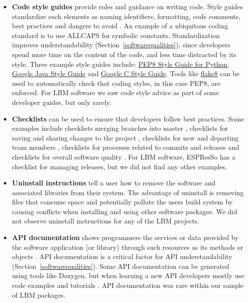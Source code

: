 \documentclass[final, 3p, times, authoryear]{elsarticle}
\newcommand{\CC}{C\nolinebreak\hspace{-.05em}\raisebox{.4ex}{\small\bf
+}\nolinebreak\hspace{-.10em}\raisebox{.4ex}{\small\bf +}}
\begin{document}
\begin{itemize}
\item \textbf{Code style guides} provide rules and guidance on writing code.
Style guides standardize such elements as naming identifiers, formatting, code
comments, best practices and dangers to avoid \citep{Carty2020}. An example of a
ubiquitous coding standard is to use ALLCAPS for symbolic constants.
Standardization improves understandability (Section~\ref{softwarequalities}),
since developers spend more time on the content of the code, and less time
distracted by its style.  Three example style guides include:
\href{http://cnl.sogang.ac.kr/cnlab/lectures/programming/python/PEP8_Style_Guide.pdf}
{PEP8 Style Guide for Python},
\href{https://google.github.io/styleguide/javaguide.html} {Google Java Style
Guide} and \href{https://google.github.io/styleguide/cppguide.html} {Google \CC
Style Guide}.  Tools like \href{https://pypi.org/project/flake8/}{flake8} can be
used to automatically check that coding styles, in this case PEP8, are enforced.
For LBM software we saw code style advice as part of some developer guides, but
only rarely.

\item \textbf{Checklists} can be used to ensure that developers follow best
practices.  Some examples include checklists merging branches into master
\citep{Brown2015}, checklists for saving and sharing changes to the project
\citep{WilsonEtAl2016}, checklists for new and departing team members
\citep{HerouxAndBernholdt2018}, checklists for processes related to commits and
releases \citep{HerouxEtAl2008} and checklists for overall software quality
\citep{ThielEtAl2020, SSI2022}.  For LBM software, ESPResSo has a checklist for
managing releases, but we did not find any other examples.

\item \textbf{Uninstall instructions} tell a user how to remove the software and
associated libraries from their system.  The advantage of uninstall is removing
files that consume space and potentially pollute the users build system by
causing conflicts when installing and using other software packages.  We did not
observe uninstall instructions for any of the LBM projects.

\item \textbf{API documentation} shows programmers the services or data provided
by the software application (or library) through such resources as its methods
or objects \citep{MengEtAl2018}.  API documentation is a critical factor for API
understandability \citep{MengEtAl2018} (Section~\ref{softwarequalities}). Some
API documentation can be generated using tools like Doxygen, but when learning a
new API developers mostly use code examples and tutorials \citep{MengEtAl2018}.
API documentation was rare within our sample of LBM packages.

\end{itemize}
\end{document}
